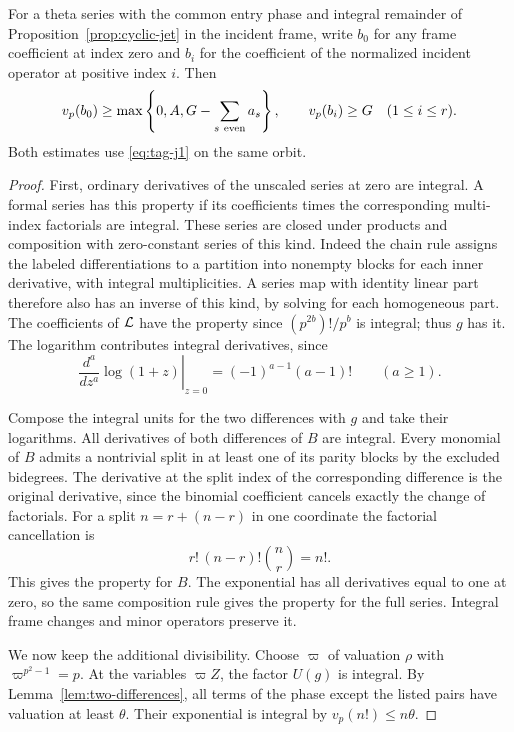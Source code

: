 \begin{proposition}\label{prop:incident-jet-indices}
For a theta series with the common entry phase and integral remainder
of Proposition~\ref{prop:cyclic-jet} in the incident frame, write \(b_0\) for any frame coefficient at index zero and \(b_i\) for the coefficient of the normalized incident operator at positive index \(i\). Then
\[
 v_p(b_0)\ge\max\left\{0,A,G-\sum_{s\ {\rm even}}a_s\right\},\qquad v_p(b_i)\ge G\quad(1\le i\le r).
\]
 Both
estimates use \eqref{eq:tag-j1} on the same orbit.
\end{proposition}

\begin{proof}
First, ordinary derivatives of the unscaled series at zero are
integral. A formal series has this property if its coefficients
times the corresponding multi-index factorials are integral.
These series are closed under products and composition with
zero-constant series of this kind. Indeed the chain rule
assigns the labeled differentiations to a partition into
nonempty blocks for each inner derivative, with integral
multiplicities. A series map with identity linear part
therefore also has an inverse of this kind, by solving for each
homogeneous part. The coefficients of \({\cal L}\) have the
property since \((p^{2b})!/p^b\) is integral; thus \(g\) has it.
The logarithm contributes integral derivatives, since
\[
  \left.\frac{d^a}{dz^a}\log(1+z)\right|_{z=0}=(-1)^{a-1}(a-1)!\qquad(a\ge1).
\]

Compose the integral units for the two differences with \(g\)
and take their logarithms. All derivatives of both differences
of \(B\) are integral. Every monomial of \(B\) admits a nontrivial
split in at least one of its parity blocks by the excluded
bidegrees. The derivative at the split index of the corresponding
difference is the original derivative, since the binomial
coefficient cancels exactly the change of factorials.
For a split \(n=r+(n-r)\) in one coordinate the factorial cancellation is
\[
  r!\,(n-r)!\binom nr=n!.
\]
 This gives
the property for \(B\). The exponential has all derivatives equal to
one at zero, so the same composition rule gives the property for
the full series. Integral frame changes and
minor operators preserve it.

We now keep the additional divisibility. Choose \(\varpi\) of
valuation \(\rho\) with \(\varpi^{p^2-1}=p\). At the variables
\(\varpi Z\), the factor \(U(g)\) is integral. By
Lemma~\ref{lem:two-differences}, all terms of the phase except
the listed pairs have valuation at least \(\theta\). Their
exponential is integral by \(v_p(n!)\le n\theta\).


\end{proof}

